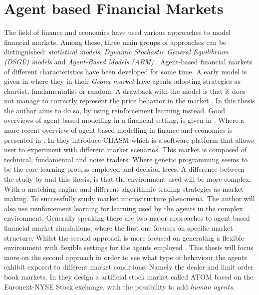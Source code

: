 \documentclass{kththesis}
\theoremstyle{definition}
\begin{document}
\newpage
\section{Agent based Financial Markets}

The field of finance and economics have used various approaches to model financial markets. Among these, three main groups of approaches can be distinguished: \textit{statistical models}, \textit{Dynamic Stochastic General Equilibrium (DSGE) models} and \textit{Agent-Based Models (ABM)} \parencite{lussange2018bright}. Agent-based financial markets of different characteristics have been developed for some time. A early model is given in \parencite{raberto2001agent} where they in their \textit{Geona market} have agents adopting strategies as chartist, fundamentalist or random. A drawback with the model is that it does not manage to correctly represent the price behavior in the market \parencite{raberto2001agent}. In this thesis the author aims to do so, by using reinforcement learning instead. 
\newline
\newline
Good overviews of agent based modelling in a financial setting, is given in \parencite{martinez2009evolutionary, boer2008agent, lebaron2006agent}. Where a more recent overview of agent based modelling in finance and economics is presented in \parencite{lussange2018bright}. In \textcite{martinez2009evolutionary} they introduce CHASM which is a software platform that allows user to experiment with different market scenarios. This market is composed of technical, fundamental and noise traders. Where genetic programming seems to be the core learning process employed and decision trees. A difference between the study by \textcite{martinez2009evolutionary} and this thesis, is that the environment used will be more complex. With a matching engine and different algorithmic trading strategies as market making. To successfully study market microstructure phenomena. The author will also use reinforcement learning for learning used by the agents in the complex environment. 
\newline
\newline
Generally speaking there are two major approaches to agent-based financial market simulations, where the first one focuses on specific market structure. Whilst the second approach is more focused on generating a flexible environment with flexible settings for the agents employed \parencite{brandouy2011design}. This thesis will focus more on the second approach in order to see what type of behaviour the agents exhibit exposed to different market conditions. Namely the dealer and limit order book markets. In \textcite{brandouy2011design} they design a artificial stock market called ATOM based on the Euronext-NYSE Stock exchange, with the possibility to add \textit{human agents}. 
\end{document}
